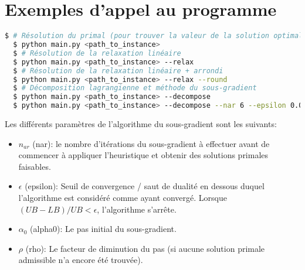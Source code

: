 \chapter{Exemples d'appel au programme}
\vspace*{1.2cm}

\begin{lstlisting}[language=bash]
  $ # Résolution du primal (pour trouver la valeur de la solution optimale)
  $ python main.py <path_to_instance>
  $ # Résolution de la relaxation linéaire
  $ python main.py <path_to_instance> --relax
  $ # Résolution de la relaxation linéaire + arrondi
  $ python main.py <path_to_instance> --relax --round
  $ # Décomposition lagrangienne et méthode du sous-gradient
  $ python main.py <path_to_instance> --decompose
  $ python main.py <path_to_instance> --decompose --nar 6 --epsilon 0.01 --alpha0 2000 --rho 0.96
\end{lstlisting}

Les différents paramètres de l'algorithme du sous-gradient sont les suivants:
\begin{itemize}
    \item $n_{ar}$ (nar): le nombre d'itérations du sous-gradient à effectuer avant de commencer à appliquer
    l'heuristique et obtenir des solutions primales faisables.
    \item $\epsilon$ (epsilon): Seuil de convergence / saut de dualité en dessous duquel l'algorithme est considéré comme
    ayant convergé. Lorsque $(UB - LB) / UB  < \epsilon$, l'algorithme s'arrête.
    \item $\alpha_0$ (alpha0): Le pas initial du sous-gradient.
    \item $\rho$ (rho): Le facteur de diminution du pas (si aucune solution primale admissible n'a encore été trouvée).
\end{itemize}